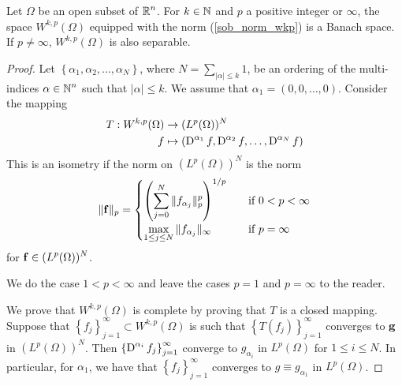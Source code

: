 \begin{theorem}
Let $\Omega$ be an open subset of $\displaystyle \mathbb{R}^n$.  For $k\in \mathbb{N}$ and
$p$ a positive integer or $\infty$, the space
$\displaystyle W^{k,p}(\Omega)$ equipped with
the norm (\ref{sob_norm_wkp}) is a Banach space.  If $p \neq \infty$,
$\displaystyle W^{k,p}(\Omega)$ is also separable.
\end{theorem}

\begin{proof}
Let $\displaystyle \left\{ \alpha_1, \alpha_2, \ldots, \alpha_N \right\}$,
where $\displaystyle N = \sum_{|\alpha|\leq k} 1$, be an ordering of
the multi-indices $\displaystyle \alpha \in \mathbb{N}^n$ such that
$|\alpha|\leq k$.  We assume that $\alpha_1 = (0, 0, \ldots, 0)$.
Consider the mapping
\begin{align*}
T: W^{k,p}(\Omega) & \rightarrow (L^p(\Omega))^N \\
f &\mapsto \left( \operatorname{D}^{\alpha_1} f , \operatorname{D}^{\alpha_2} f, \ldots,
\operatorname{D}^{\alpha_N} f \right)
\end{align*}
This is an isometry if the norm on $\displaystyle (L^p(\Omega))^N$ is
the norm
\[
\| \mathbf{f} \|_{p} =
\begin{cases}
\displaystyle \left( \sum_{j=0}^N \| f_{\alpha_j} \|_p^p \right)^{1/p} &
\quad \text{if} \ 0 < p < \infty \\
\displaystyle \max_{1\leq j \leq N} \| f_{\alpha_j} \|_\infty &
\quad \text{if} \ p = \infty
\end{cases}
\]
for $\displaystyle \mathbf{f} \in (L^p(\Omega))^N$.

  We do the case $1<p<\infty$ and leave the cases $p =1$ and
$p=\infty$ to the reader.

We prove that $\displaystyle W^{k,p}(\Omega)$ is complete
by proving that $T$ is a closed mapping. Suppose that
$\displaystyle \left\{f_j \right\}_{j=1}^\infty \subset W^{k,p}(\Omega)$
is such that $\displaystyle \left\{T(f_j) \right\}_{j=1}^\infty$
converges to $\mathbf{g}$ in $\displaystyle (L^p(\Omega))^N$.  Then
$\displaystyle \left\{ \operatorname{D}^{\alpha_i} f_j \right\}_{j=1}^\infty$
converge to $g_{\alpha_i}$ in $\displaystyle L^p(\Omega)$ for
$1\leq i \leq N$.  In particular, for $\alpha_1$, we have that
$\displaystyle \left\{ f_j \right\}_{j=1}^\infty$
converges to $g \equiv g_{\alpha_1}$ in $\displaystyle L^p(\Omega)$.


\end{proof}
